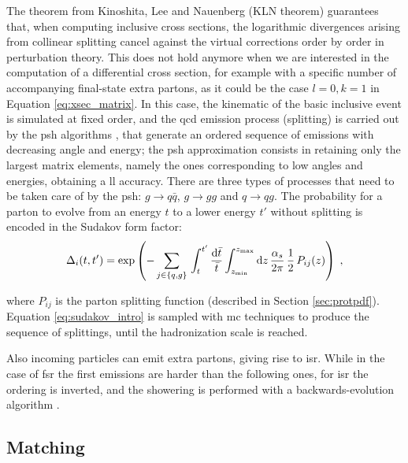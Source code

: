 The theorem from Kinoshita, Lee and Nauenberg (KLN theorem) \cite{Kinoshita:1962ur,Lee:1964is} guarantees that, 
when computing inclusive cross sections, the logarithmic divergences arising from collinear splitting cancel against the virtual corrections order by order in perturbation theory. 
This does not hold anymore when we are interested in the computation of a differential cross section, for example with a specific number of accompanying final-state extra partons, 
as it could be the case $l=0, k=1$ in Equation \ref{eq:xsec_matrix}. 
In this case, the kinematic of the basic inclusive event is simulated at fixed order, and the \gls{qcd} emission process (splitting) is carried out by the \gls{psh} algorithms \cite{Fox:1979ag}, that generate an ordered sequence of emissions with decreasing angle and energy; the \gls{psh} approximation consists in retaining only the largest matrix elements, namely the ones corresponding to low angles and energies, obtaining a \gls{ll} accuracy.
There are three types of processes that need to be taken care of by the \gls{psh}: $g \rightarrow q\bar{q}$, $g \rightarrow gg$ and $q \rightarrow q g$.
The probability for a parton to evolve from an energy $t$ to a lower energy $t'$ without splitting is encoded in the Sudakov form factor:
\begin{equation}
  \Delta_i(t,t')=\exp\left(-\sum_{j\in\{q,g\}}\,
  \int_t^{t'}\frac{{\rm{d}}\bar{t}}{\bar{t}}\int_{z_{\rm min}}^{z_{\rm max}}{\rm{d}} z\,
  \frac{ \alpha_s }{2 \pi } \, \frac{1}{2} \, P_{ij}(z) \right) \;,
  \label{eq:sudakov_intro}
\end{equation}

\noindent where $P_{ij}$ is the parton splitting function (described in Section \ref{sec:protpdf}).
Equation \ref{eq:sudakov_intro} is sampled with \gls{mc} techniques to produce the sequence of splittings, until the hadronization scale is reached. 

Also incoming particles can emit extra partons, giving rise to \gls{isr}. While in the case of \gls{fsr} the first emissions are harder than the following ones, for \gls{isr} the ordering is inverted, and the showering is performed with a backwards-evolution algorithm \cite{Sjostrand:1985xi}.

\subsection{Matching}

